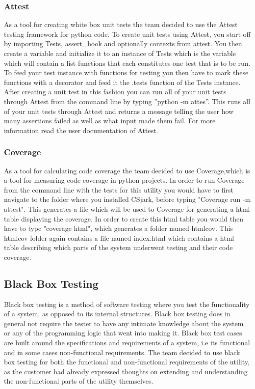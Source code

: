 \subsubsection{Attest}
As a tool for creating white box unit tests the team decided to use the Attest testing framework for python code. To create unit tests using Attest, you start off by importing Tests, assert\_hook and optionally contexts from attest. You then create a variable and initialize it to an instance of Tests which is the variable which will contain a list functions that each constitutes one test that is to be run. To feed your test instance with functions for testing you then have to mark these functions with a decorator and feed it the .tests function of the Tests instance. After creating a unit test in this fashion you can run all of your unit tests through Attest from the command line by typing ''python -m attes''. This runs all of your unit tests through Attest and returns a message telling the user how many assertions failed as well as what input made them fail. For more information read the user documentation of Attest. 

\subsubsection{Coverage}
As a tool for calculating code coverage the team decided to use Coverage,which is a tool for measuring code coverage in python projects. In order to run Coverage from the command line with the tests for this utility you would have to first navigate to the folder where you installed CSjark, before typing "Coverage run -m attest". This generates a file which will be used to Coverage for generating a html table displaying the coverage. In order to create this html table you would then have to type "coverage html", which generates a folder named htmlcov. This htmlcov folder again contains a file named index.html which contains a html table describing which parts of the system underwent testing and their code coverage.



\subsection{Black Box Testing}
Black box testing is a method of software testing where you test the functionality of a system, as opposed to its internal structures. Black box testing does in general not require the tester to have any intimate knowledge about the system or any of the programming logic that went into making it. Black box test cases are built around the specifications and requirements of a system, i.e its functional and in some cases non-functional requirements. The team decided to use black box testing for both the functional and non-functional requirements of the \gls{utility}, as the customer had already expressed thoughts on extending and understanding the non-functional parts of the \gls{utility} themselves. 


